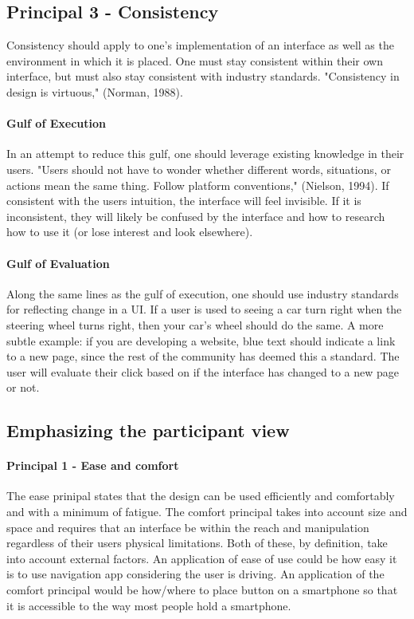\subsection{Principal 3 - Consistency}
Consistency should apply to one's implementation of an interface as well as the environment in which it is placed. One must stay consistent within their own interface, but must also stay consistent with industry standards. "Consistency in design is virtuous," (Norman, 1988).

\paragraph{Gulf of Execution}
In an attempt to reduce this gulf, one should leverage existing knowledge in their users. "Users should not have to wonder whether different words, situations, or actions mean the same thing. Follow platform conventions," (Nielson, 1994). If consistent with the users intuition, the interface will feel invisible. If it is inconsistent, they will likely be confused by the interface and how to research how to use it (or lose interest and look elsewhere).

\paragraph{Gulf of Evaluation}
Along the same lines as the gulf of execution, one should use industry standards for reflecting change in a UI. If a user is used to seeing a car turn right when the steering wheel turns right, then your car's wheel should do the same. A more subtle example: if you are developing a website, blue text should indicate a link to a new page, since the rest of the community has deemed this a standard. The user will evaluate their click based on if the interface has changed to a new page or not.


\subsection{Emphasizing the participant view}
\paragraph{Principal 1 - Ease and comfort}
The ease prinipal states that the design can be used efficiently and comfortably and with a minimum of fatigue. The comfort principal takes into account size and space and requires that an interface be within the reach and manipulation regardless of their users physical limitations. Both of these, by definition, take into account external factors. An application of ease of use could be how easy it is to use navigation app considering the user is driving. An application of the comfort principal would be how/where to place button on a smartphone so that it is accessible to the way most people hold a smartphone.

